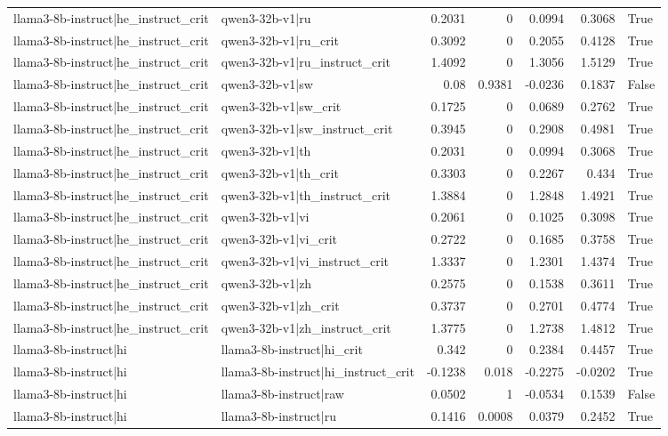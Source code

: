 \begin{table}
\begin{tabular}{l l r r r r l}
llama3-8b-instruct|he_instruct_crit & qwen3-32b-v1|ru & 0.2031 & 0 & 0.0994 & 0.3068 & True \\
llama3-8b-instruct|he_instruct_crit & qwen3-32b-v1|ru_crit & 0.3092 & 0 & 0.2055 & 0.4128 & True \\
llama3-8b-instruct|he_instruct_crit & qwen3-32b-v1|ru_instruct_crit & 1.4092 & 0 & 1.3056 & 1.5129 & True \\
llama3-8b-instruct|he_instruct_crit & qwen3-32b-v1|sw & 0.08 & 0.9381 & -0.0236 & 0.1837 & False \\
llama3-8b-instruct|he_instruct_crit & qwen3-32b-v1|sw_crit & 0.1725 & 0 & 0.0689 & 0.2762 & True \\
llama3-8b-instruct|he_instruct_crit & qwen3-32b-v1|sw_instruct_crit & 0.3945 & 0 & 0.2908 & 0.4981 & True \\
llama3-8b-instruct|he_instruct_crit & qwen3-32b-v1|th & 0.2031 & 0 & 0.0994 & 0.3068 & True \\
llama3-8b-instruct|he_instruct_crit & qwen3-32b-v1|th_crit & 0.3303 & 0 & 0.2267 & 0.434 & True \\
llama3-8b-instruct|he_instruct_crit & qwen3-32b-v1|th_instruct_crit & 1.3884 & 0 & 1.2848 & 1.4921 & True \\
llama3-8b-instruct|he_instruct_crit & qwen3-32b-v1|vi & 0.2061 & 0 & 0.1025 & 0.3098 & True \\
llama3-8b-instruct|he_instruct_crit & qwen3-32b-v1|vi_crit & 0.2722 & 0 & 0.1685 & 0.3758 & True \\
llama3-8b-instruct|he_instruct_crit & qwen3-32b-v1|vi_instruct_crit & 1.3337 & 0 & 1.2301 & 1.4374 & True \\
llama3-8b-instruct|he_instruct_crit & qwen3-32b-v1|zh & 0.2575 & 0 & 0.1538 & 0.3611 & True \\
llama3-8b-instruct|he_instruct_crit & qwen3-32b-v1|zh_crit & 0.3737 & 0 & 0.2701 & 0.4774 & True \\
llama3-8b-instruct|he_instruct_crit & qwen3-32b-v1|zh_instruct_crit & 1.3775 & 0 & 1.2738 & 1.4812 & True \\
llama3-8b-instruct|hi & llama3-8b-instruct|hi_crit & 0.342 & 0 & 0.2384 & 0.4457 & True \\
llama3-8b-instruct|hi & llama3-8b-instruct|hi_instruct_crit & -0.1238 & 0.018 & -0.2275 & -0.0202 & True \\
llama3-8b-instruct|hi & llama3-8b-instruct|raw & 0.0502 & 1 & -0.0534 & 0.1539 & False \\
llama3-8b-instruct|hi & llama3-8b-instruct|ru & 0.1416 & 0.0008 & 0.0379 & 0.2452 & True \\

\end{tabular}
\end{table}
